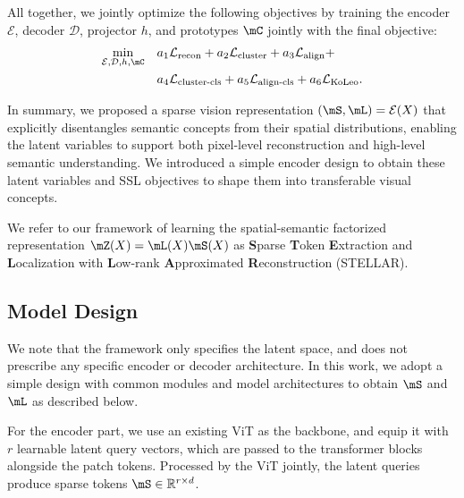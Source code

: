 All together, we jointly optimize the following objectives by training the encoder $\mathcal{E}$, decoder $\mathcal{D}$, projector $h$, and prototypes $\mC$ jointly with the final objective:
\begin{align}
\min_{\mathcal{E}, \mathcal{D}, h, \mC} \quad & a_1\mathcal{L}_\text{recon} + a_2\mathcal{L}_\text{cluster} + a_3\mathcal{L}_\text{align} + \\ & a_4\mathcal{L}_\text{cluster-cls} + a_5\mathcal{L}_\text{align-cls} + a_6\mathcal{L}_\text{KoLeo}.
\end{align}


In summary, we proposed a sparse vision representation $(\mS, \mL) = \mathcal{E}(X)$ that explicitly disentangles semantic concepts from their spatial distributions, enabling the latent variables to support both pixel-level reconstruction and high-level semantic understanding. We introduced a simple encoder design to obtain these latent variables and SSL objectives to shape them into transferable visual concepts.

We refer to our framework of learning the spatial-semantic factorized representation $\mZ(X) = \mL(X) \mS(X)$ as \textbf{S}parse \textbf{T}oken \textbf{E}xtraction and \textbf{L}ocalization with \textbf{L}ow-rank \textbf{A}pproximated \textbf{R}econstruction (STELLAR). 

\subsection{Model Design}
We note that the framework only specifies the latent space, and does not prescribe any specific encoder or decoder architecture. In this work, we adopt a simple design with common modules and model architectures to obtain $\mS$ and $\mL$ as described below.

For the encoder part, we use an existing ViT\citep{dosovitskiy2020image} as the backbone, and equip it with $r$ learnable latent query vectors, which are passed to the transformer blocks alongside the patch tokens. Processed by the ViT jointly, the latent queries produce sparse tokens $\mS \in \mathbb{R}^{r \times d}$. 


